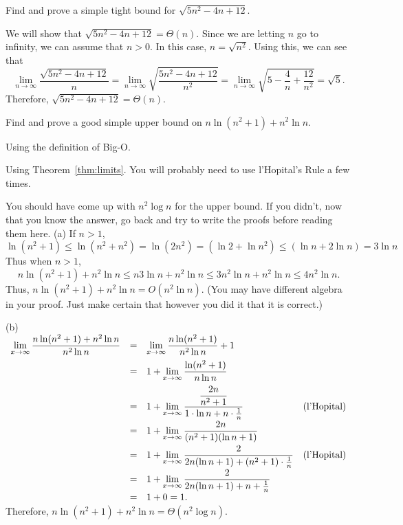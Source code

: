 \begin{exa}
Find and prove a simple tight bound for  $\sqrt{5n^2-4n+12}$.
\begin{sol}
We will show that $\sqrt{5n^2-4n+12}=\Theta(n)$.
Since we are letting $n$ go to infinity, we can assume that $n>0$.  In this case, 
$n=\sqrt{n^2}$.
Using this, we can see that 
$$\lim_{n\rightarrow\infty}\frac{\sqrt{5n^2-4n+12}}{n}
=\lim_{n\rightarrow\infty}\sqrt{\frac{5n^2-4n+12}{n^2}}
=\lim_{n\rightarrow\infty}\sqrt{5 - \frac{4}{n}+\frac{12}{n^2}}
=\sqrt{5}.
$$
Therefore, $\sqrt{5n^2-4n+12}=\Theta(n)$.
\end{sol}
\end{exa}

\newpage

\begin{exer}
Find and prove a good simple upper bound on $n\ln (n^2+1) + n^2\ln n$.
\begin{lenum}
\item Using the definition of Big-O.

\vspace*{3.5in}
\item Using Theorem~\ref{thm:limits}. 
You will probably need to use l'Hopital's Rule a few times.

\vspace*{4in}
\end{lenum}
\begin{answer}
You should have come up with $n^2\log n$ for the upper bound.  If you didn't,
now that you know the answer, go back and try to write the proofs before
reading them here.
(a) 
If $n> 1$, 
$$\ln (n^2+1) \leq \ln (n^2+n^2)= \ln (2 n^2) =
( \ln 2+ \ln n^2) \leq ( \ln n+ 2\ln n) =3\ln n$$
Thus when $n > 1$,
$$ n\ln (n^2+1) + n^2\ln n\leq n 3\ln n+n^2\ln n\leq
3 n^2 \ln n+n^2\ln n\leq  4 n^2 \ln n. $$
Thus, $n\ln (n^2+1) + n^2\ln n=O(n^2 \ln n).$
(You may have different algebra in your proof.  Just make certain
that however you did it that it is correct.)

(b)
$
\begin{array}[t]{llll}
\displaystyle\lim_{x\rightarrow\infty} \dfrac{{n\ln (n^2+1) + n^2\ln n}}{ n^2\ln n}
& =& \displaystyle\lim_{x\rightarrow\infty}
\dfrac{n\ln (n^2+1)}{ n^2\ln n}  + 1\\[.125in]
& =& \displaystyle1+ \lim_{x\rightarrow\infty}
\dfrac{\ln (n^2+1)}{ n\ln n} \\[.125in]
& =& \displaystyle1+ \lim_{x\rightarrow\infty}
\dfrac{\dfrac{2n}{n^2+1}}{1\cdot\ln n+n\cdot\frac{1}{n}} &\mbox{(l'Hopital)}\\[.125in]
& =& \displaystyle1+ \lim_{x\rightarrow\infty}
\dfrac{2n}{(n^2+1)(\ln n+1)} \\[.125in]
& =&\displaystyle 1+ \lim_{x\rightarrow\infty}
\dfrac{2}{2n(\ln n + 1) + (n^2+1)\cdot\frac{1}{n}} &\mbox{(l'Hopital)}\\[.125in]
& =&\displaystyle 1+ \lim_{x\rightarrow\infty}
\dfrac{2}{2n(\ln n + 1) + n+\frac{1}{n}}\\
&=&1+0=1.
\end{array}
$\\
Therefore,  $n\ln (n^2+1) + n^2\ln n=\Theta(n^2\log n)$.
\end{answer}
\end{exer}
\newpage

